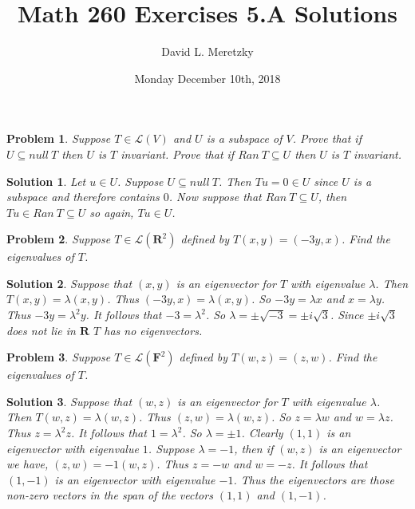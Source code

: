 \documentclass{article}
\title{ \vspace{-10ex} %
Math 260 Exercises 5.A Solutions
}
\author{David L. Meretzky
}
\date{%
Monday December 10th, 2018
}
\theoremstyle{problemstyle}
\newtheorem{problem}{Problem}
\theoremstyle{problemstyle}
\newtheorem{solution}{Solution}
\begin{document}
\maketitle

\begin{problem}
Suppose $T \in \mathscr{L}(V)$ and $U$ is a subspace of $V$. Prove that if $U \subseteq null \ T$ then $U$ is $T$ invariant. Prove that if $Ran \ T \subseteq U$ then $U$ is $T$ invariant.   
\end{problem}

\begin{solution}
Let $u \in U$. Suppose $U \subseteq null \ T$. Then $Tu = 0 \in U$ since $U$ is a subspace and therefore contains $0$.  Now suppose that $Ran \ T \subseteq U$, then $Tu \in Ran \ T \subseteq U$ so again, $Tu \in U$. 
\end{solution}

\begin{problem}
Suppose $T \in \mathscr{L}(\textbf{R}^2)$ defined by $T(x,y) = (-3y,x)$. Find the eigenvalues of $T$. 
\end{problem}

\begin{solution}
Suppose that $(x,y)$ is an eigenvector for $T$ with eigenvalue $\lambda$. Then $T(x,y) = \lambda(x,y)$. Thus $(-3y,x)= \lambda(x,y)$. So $-3y = \lambda x$ and $x = \lambda y$. Thus $-3y = \lambda^2 y$. It follows that $-3 = \lambda^2$. So $\lambda = \pm \sqrt{-3} = \pm i\sqrt{3}$. Since $\pm i\sqrt{3}$ does not lie in $\textbf{R}$ $T$ has no eigenvectors. 
\end{solution}

\begin{problem}
Suppose $T \in \mathscr{L}(\textbf{F}^2)$ defined by $T(w,z) = (z,w)$. Find the eigenvalues of $T$. 
\end{problem}

\begin{solution}
Suppose that $(w,z)$ is an eigenvector for $T$ with eigenvalue $\lambda$. Then $T(w,z) = \lambda(w,z)$. Thus $(z,w)= \lambda(w,z)$. So $z = \lambda w$ and $w = \lambda z$. Thus $z = \lambda^2 z$. It follows that $1 = \lambda^2$. So $\lambda = \pm 1$. Clearly $(1,1)$ is an eigenvector with eigenvalue $1$. Suppose $\lambda = -1$, then if $(w,z)$ is an eigenvector we have, $(z,w)= -1(w,z)$. Thus $z = -w$ and $w = -z$.  It follows that $(1,-1)$ is an eigenvector with eigenvalue $-1$. Thus the eigenvectors are those non-zero vectors in the span of the vectors $(1,1)$ and $(1,-1)$. 
\end{solution}
\end{document}
